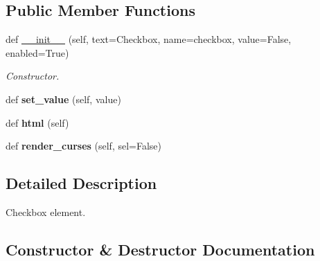 \subsection*{Public Member Functions}
\begin{DoxyCompactItemize}
\item 
def \hyperlink{classwax_1_1Components_1_1WCheckBox_a4be3a9f77c93e57d2feb0755ac3d9ba4}{\+\_\+\+\_\+init\+\_\+\+\_\+} (self, text=\textquotesingle{}Checkbox\textquotesingle{}, name=\textquotesingle{}checkbox\textquotesingle{}, value=False, enabled=True)
\begin{DoxyCompactList}\small\item\em Constructor. \end{DoxyCompactList}\item 
def {\bfseries set\+\_\+value} (self, value)\hypertarget{classwax_1_1Components_1_1WCheckBox_a0b335395de207887683cb755bace5bcc}{}\label{classwax_1_1Components_1_1WCheckBox_a0b335395de207887683cb755bace5bcc}

\item 
def {\bfseries html} (self)\hypertarget{classwax_1_1Components_1_1WCheckBox_a72576669baf815e3573be4afea8118ee}{}\label{classwax_1_1Components_1_1WCheckBox_a72576669baf815e3573be4afea8118ee}

\item 
def {\bfseries render\+\_\+curses} (self, sel=False)\hypertarget{classwax_1_1Components_1_1WCheckBox_a305cdfe963d0ab8c014d67b4b3ec8c2f}{}\label{classwax_1_1Components_1_1WCheckBox_a305cdfe963d0ab8c014d67b4b3ec8c2f}

\end{DoxyCompactItemize}


\subsection{Detailed Description}
Checkbox element. 

\subsection{Constructor \& Destructor Documentation}
